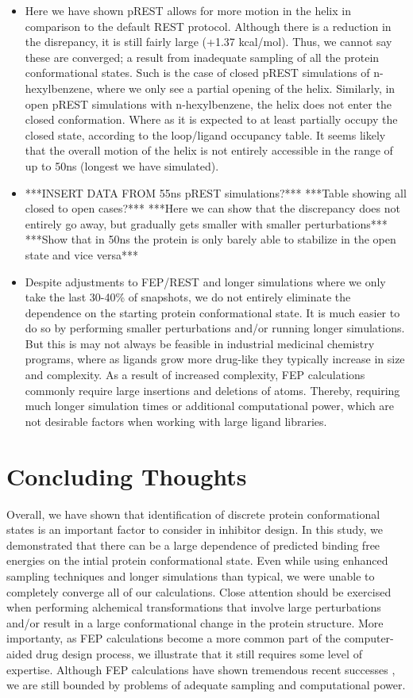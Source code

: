 \documentclass{article}
\begin{document}
\begin{itemize}
   \item Here we have shown pREST allows for more motion in the helix in comparison to the default REST protocol.
      Although there is a reduction in the disrepancy, it is still fairly large (+1.37 kcal/mol).
      Thus, we cannot say these are converged; a result from inadequate sampling of all the protein conformational states.
      Such is the case of closed pREST simulations of n-hexylbenzene, where we only see a partial opening of the helix.
      Similarly, in open pREST simulations with n-hexylbenzene, the helix does not enter the closed conformation.
      Where as it is expected to at least partially occupy the closed state, according to the loop/ligand occupancy table.
      It seems likely that the overall motion of the helix is not entirely accessible in the range of up to 50ns (longest we have simulated).
   \item ***INSERT DATA FROM 55ns pREST simulations?***
      ***Table showing all closed to open cases?***
      ***Here we can show that the discrepancy does not entirely go away, but gradually gets smaller with smaller perturbations***
      ***Show that in 50ns the protein is only barely able to stabilize in the open state and vice versa***
   \item Despite adjustments to FEP/REST and longer simulations where we only take the last 30-40\% of snapshots, 
      we do not entirely eliminate the dependence on the starting protein conformational state.
      It is much easier to do so by performing smaller perturbations and/or running longer simulations.
      But this is may not always be feasible in industrial medicinal chemistry programs, where as ligands grow more drug-like they typically increase in size and complexity.
      As a result of increased complexity, FEP calculations commonly require large insertions and deletions of atoms.
      Thereby, requiring much longer simulation times or additional computational power, which are not desirable factors when working with large ligand libraries.
   \end{itemize}

\section{Concluding Thoughts}
Overall, we have shown that identification of discrete protein conformational states is an important factor to consider in inhibitor design.
In this study, we demonstrated that there can be a large dependence of predicted binding free energies on the intial protein conformational state.
Even while using enhanced sampling techniques and longer simulations than typical, we were unable to completely converge all of our calculations.
Close attention should be exercised when performing alchemical transformations that involve large perturbations and/or result in a large conformational change in the protein structure.
More importanty, as FEP calculations become a more common part of the computer-aided drug design process, we illustrate that it still requires some level of expertise.
Although FEP calculations have shown tremendous recent successes \cite{FEPplus}, we are still bounded by problems of adequate sampling and computational power.
\end{document}

